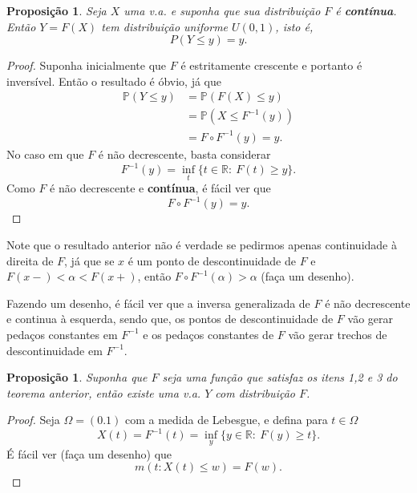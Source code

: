 \documentclass[12pt,a4paper,oneside]{book}
\newtheorem{proposition}[theorem]{Proposi\c{c}\~ao}
\theoremstyle{definition}
\newtheorem{definition}[theorem]{Defini\c{c}\~ao}
\theoremstyle{remark}
\numberwithin{equation}{section}
\newcommand{\R}{\mathbb{R}}
\newcommand{\pr}{\mathbb{P}}
\begin{document}
\begin{proposition}
Seja $X$ uma v.a. e suponha que sua distribuição $F$ é \textbf{contínua}. Então $Y= F(X)$ tem distribuição uniforme $U(0,1)$, isto é, 
$$P(Y\leq y) = y. $$
\end{proposition}
\begin{proof}
Suponha inicialmente que $F$ é estritamente crescente e portanto é inversível. Então o resultado é óbvio, já que
\begin{align*}
\pr(Y\leq y) &= \pr(F(X)\leq y)\\
&= \pr(X\leq F^{-1}(y))\\
&= F\circ F^{-1}(y) = y.
\end{align*}
No caso em que $F$ é não decrescente, basta considerar 
$$F^{-1}(y) = \inf_t \{ t\in \R:\ F(t) \geq  y  \}. $$
Como $F$ é não decrescente e \textbf{contínua}, é fácil ver que
$$F\circ F^{-1}(y) = y. $$
\end{proof}

\begin{tcolorbox}[colback = yellow!60]
Note que o resultado anterior não é verdade se pedirmos apenas continuidade à direita de $F$, já que se $x$ é um ponto de descontinuidade de $F$ e  $F(x-)<\alpha<F(x+)$, então $F\circ F^{-1}(\alpha)> \alpha$ (faça um desenho).
\end{tcolorbox}

\begin{tcolorbox}[colback = yellow!60]
Fazendo um desenho, é fácil ver que a inversa generalizada de $F$ é não decrescente e continua à esquerda, sendo que, os pontos de descontinuidade de $F$ vão gerar pedaços constantes em $F^{-1}$ e os pedaços constantes de $F$ vão gerar trechos de descontinuidade em $F^{-1}$.
\end{tcolorbox}


\begin{proposition}\label{prop- volta da funcDistri}
Suponha que $F$ seja uma função que satisfaz os itens 1,2 e 3 do teorema anterior, então existe uma v.a. $Y$ com distribuição $F$.
\end{proposition}
\begin{proof}
Seja $\Omega = (0.1)$ com a medida de Lebesgue, e defina para $t\in \Omega$
$$X(t) = F^{-1}(t) =  \inf_y \{ y\in \R:\ F(y) \geq  t  \}.$$
É fácil ver (faça um desenho) que 
$$m(t:X(t)\leq w) = F(w).  $$
\end{proof}


\end{document}
